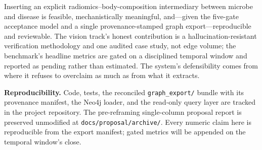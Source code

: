 \documentclass[10pt,twocolumn,letterpaper]{article}
\begin{document}
Inserting an explicit radiomics--body-composition intermediary between
microbe and disease is feasible, mechanistically meaningful, and---given the
five-gate acceptance model and a single provenance-stamped graph
export---reproducible and reviewable. The vision track's honest contribution
is a hallucination-resistant verification methodology and one audited
case study, not edge volume; the benchmark's headline metrics are gated on a
disciplined temporal window and reported as pending rather than estimated.
The system's defensibility comes from where it refuses to overclaim as much
as from what it extracts.

\vspace{1ex}
\noindent\textbf{Reproducibility.} Code, tests, the reconciled
\texttt{graph\_export/} bundle with its provenance manifest, the Neo4j
loader, and the read-only query layer are tracked in the project repository.
The pre-reframing single-column proposal report is preserved unmodified at
\texttt{docs/proposal/archive/}. Every numeric claim here is reproducible
from the export manifest; gated metrics will be appended on the temporal
window's close.
\end{document}
